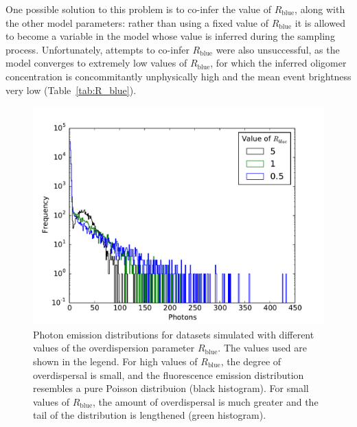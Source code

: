 One possible solution to this problem is to co-infer the value of $R_{\text{blue}}$, along with the other model parameters: rather than using a fixed value of $R_{\text{blue}}$ it is allowed to become a variable in the model whose value is inferred during the sampling process. Unfortunately, attempts to co-infer $R_{\text{blue}}$ were also unsuccessful, as the model converges to extremely low values of $R_{\text{blue}}$, for which the inferred oligomer concentration is concommitantly unphysically high and the mean event brightness very low (Table~\ref{tab:R_blue}). 

\begin{figure}
   \begin{center}
      \includegraphics*[clip=true, width=6in]{sizing/varying_R_blue.pdf}
      \caption{Photon emission distributions for datasets simulated with different values of the overdispersion parameter $R_{\text{blue}}$. The values used are shown in the legend. For high values of $R_{\text{blue}}$, the degree of overdispersal is small, and the fluorescence emission distribution resembles a pure Poisson distribuion (black histogram). For small values of $R_{\text{blue}}$, the amount of overdispersal is much greater and the tail of the distribution is lengthened (green histogram).} 
      \label{fig:R_blue}
   \end{center}
\end{figure}

